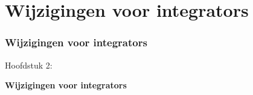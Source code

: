 %

\section{Wijzigingen voor integrators}
\begin{frame}[fragile]
	\frametitle{Wijzigingen voor integrators}

	\begin{center}\huge{Hoofdstuk 2:}\end{center}
	\begin{center}\huge{\color{typo3darkgrey}\textbf{Wijzigingen voor integrators}}\end{center}

\end{frame}


